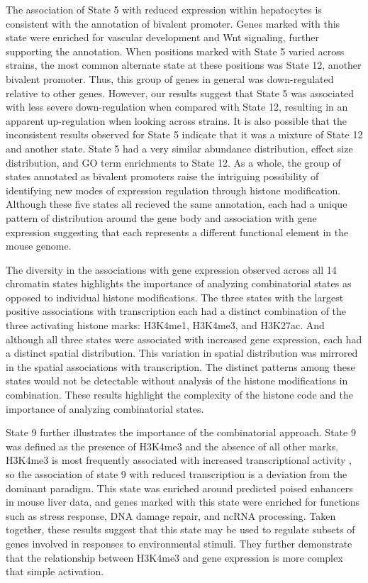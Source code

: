 \documentclass[
  11pt,
]{article}
\begin{document}
The association of State 5 with reduced expression within hepatocytes is
consistent with the annotation of bivalent promoter. Genes marked with
this state were enriched for vascular development and Wnt signaling,
further supporting the annotation. When positions marked with State 5
varied across strains, the most common alternate state at these
positions was State 12, another bivalent promoter. Thus, this group of
genes in general was down-regulated relative to other genes. However,
our results suggest that State 5 was associated with less severe
down-regulation when compared with State 12, resulting in an apparent
up-regulation when looking across strains. It is also possible that the
inconsistent results observed for State 5 indicate that it was a mixture
of State 12 and another state. State 5 had a very similar abundance
distribution, effect size distribution, and GO term enrichments to State
12. As a whole, the group of states annotated as bivalent promoters
raise the intriguing possibility of identifying new modes of expression
regulation through histone modification. Although these five states all
recieved the same annotation, each had a unique pattern of distribution
around the gene body and association with gene expression suggesting
that each represents a different functional element in the mouse genome.

The diversity in the associations with gene expression observed across
all 14 chromatin states highlights the importance of analyzing
combinatorial states as opposed to individual histone modifications. The
three states with the largest positive associations with transcription
each had a distinct combination of the three activating histone marks:
H3K4me1, H3K4me3, and H3K27ac. And although all three states were
associated with increased gene expression, each had a distinct spatial
distribution. This variation in spatial distribution was mirrored in the
spatial associations with transcription. The distinct patterns among
these states would not be detectable without analysis of the histone
modifications in combination. These results highlight the complexity of
the histone code and the importance of analyzing combinatorial states.

State 9 further illustrates the importance of the combinatorial
approach. State 9 was defined as the presence of H3K4me3 and the absence
of all other marks. H3K4me3 is most frequently associated with increased
transcriptional activity
\citep{pmid15680324, pmid14661024, pmid12353038, pmid16728976}, so the
association of state 9 with reduced transcription is a deviation from
the dominant paradigm. This state was enriched around predicted poised
enhancers in mouse liver data, and genes marked with this state were
enriched for functions such as stress response, DNA damage repair, and
ncRNA processing. Taken together, these results suggest that this state
may be used to regulate subsets of genes involved in responses to
environmental stimuli. They further demonstrate that the relationship
between H3K4me3 and gene expression is more complex that simple
activation.
\end{document}
